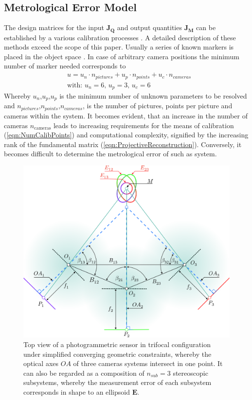 \documentclass[5p,times,procedia]{elsarticle}
\begin{document}
\subsection{Metrological Error Model}
\label{met_err_model}
The design matrices for the input $\mathbf{J_{Q}}$ and output quantities $\mathbf{J_{M}}$ can be established by a various calibration processes \cite{Hartley2018}.  A detailed description of these methods exceed the scope of this paper. Usually a series of known markers is placed in the object space \cite{Luhmann2003}. In case of arbitrary camera positions the minimum number of marker needed corresponds to
%
\begin{equation}
	\label{eqn:NumCalibPoints}
	\begin{aligned}
		& 	u = u_n \cdot n_{pictures} + u_p \cdot n_{points} + u_c \cdot n_{cameras} \\
		& \text{with: } u_n = 6\text{, } u_p = 3\text{, } u_c = 6 
	\end{aligned}
\end{equation}
%
Whereby $u_n$,$u_p$,$u_p$ is the minimum number of unknown parameters to be resolved and $n_{pictures}$,$n_{points}$,$n_{cameras}$, is the 
number of pictures, points per picture and cameras within the system. It becomes evident, that an increase in the number of cameras $n_{\text{cameras}}$ leads to increasing requirements for the means of calibration (\ref{eqn:NumCalibPoints}) and computational complexity, signified by the increasing rank of the fundamental matrix (\ref{eqn:ProjectiveReconstruction}). Conversely, it becomes difficult to determine the metrological error of such as system.
%
\begin{figure}[H]
	\centering
	\includegraphics[width=0.90\linewidth]{graphics/MixedErrorCuttingGeometry.eps}
	\caption{Top view of a photogrammetric sensor in trifocal configuration under simplified converging geometric constraints, whereby the optical axes $OA$ of three cameras systems intersect in one point.		
		It can also be regarded as a composition of $n_{sub}=3$ stereoscopic subsystems, whereby the measurement error of each subsystem corresponds in shape to an ellipsoid $\mathbf{E}$.}
	\label{fig:sub_sensors}
\end{figure}
\end{document}
